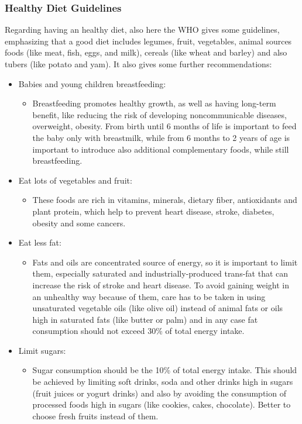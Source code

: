 \subsubsection{Healthy Diet Guidelines}
Regarding having an healthy diet, also here the WHO gives some guidelines, emphasizing that a good diet includes legumes, fruit, vegetables, animal sources foods (like meat, fish, eggs, and milk), cereals (like wheat and barley) and also tubers (like potato and yam). It also gives some further recommendations\cite{WhoHealthyDietGuidelines}: 

\begin{itemize}[nosep] %
    \item Babies and young children breastfeeding:
          \begin{itemize}[nosep]
              \item Breastfeeding promotes healthy growth, as well as having long-term benefit, like reducing the risk of developing noncommunicable diseases, overweight, obesity. From birth until 6 months of life is important to feed the baby only with breastmilk, while from 6 months to 2 years of age is important to introduce also additional complementary foods, while still breastfeeding.
          \end{itemize}
          
    \item Eat lots of vegetables and fruit:
          \begin{itemize}[nosep]
              \item These foods are rich in vitamins, minerals, dietary fiber, antioxidants and plant protein, which help to prevent heart disease, stroke, diabetes, obesity and some cancers.
          \end{itemize}
          
    \item Eat less fat:
          \begin{itemize}[nosep]
              \item Fats and oils are concentrated source of energy, so it is important to limit them, especially saturated and industrially-produced trans-fat that can increase the risk of stroke and heart disease. To avoid gaining weight in an unhealthy way because of them, care has to be taken in using unsaturated vegetable oils (like olive oil) instead of animal fats or oils high in saturated fats (like butter or palm) and in any case fat consumption should not exceed 30\% of total energy intake.
          \end{itemize}
          
    \item Limit sugars:
          \begin{itemize}[nosep]
              \item Sugar consumption should be the 10\% of total energy intake. This should be achieved by limiting soft drinks, soda and other drinks high in sugars (fruit juices or yogurt drinks) and also by avoiding the consumption of processed foods high in sugars (like cookies, cakes, chocolate). Better to choose fresh fruits instead of them.
          \end{itemize}
\end{itemize}

